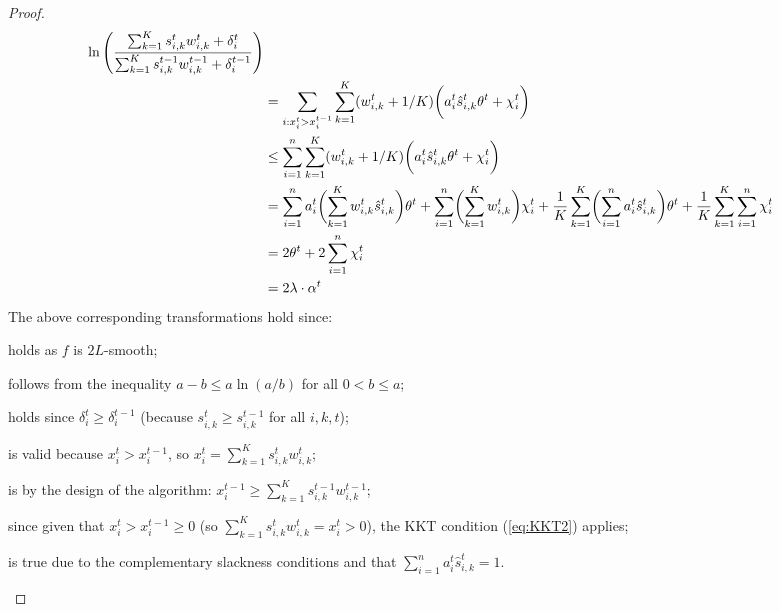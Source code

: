 \begin{proof}
\begin{align}
            \ln \left(\frac{ \sum_{k=1}^{K} s_{i,k}^{t} w_{i,k}^{t}  + \delta_{i}^{t}}{\sum_{k=1}^{K}  s_{i,k}^{t-1} w_{i,k}^{t-1}  + \delta_{i}^{t-1}}  \right) \notag \\
%
&=  \sum_{i: x_{i}^{t} > x_{i}^{t-1}} \sum_{k=1}^{K} (w_{i,k}^{t} + 1/K) \biggl( a_{i}^{t} \hat{s}_{i,k}^{t} \theta^{t} + \chi_{i}^{t} \biggr)  \\
%
&\leq \sum_{i=1}^{n} \sum_{k=1}^{K} (w_{i,k}^{t} + 1/K) \biggl( a_{i}^{t} \hat{s}_{i,k}^{t} \theta^{t} + \chi_{i}^{t} \biggr) \notag \\
%
&= \sum_{i=1}^{n} a_{i}^{t} \biggl(\sum_{k=1}^{K} w_{i,k}^{t} \hat{s}_{i,k}^{t} \biggr) \theta^t + \sum_{i=1}^{n} \biggl( \sum_{k=1}^{K} w_{i,k}^{t} \biggr) \chi_{i}^{t}
+ \frac{1}{K}  \sum_{k=1}^{K} \biggl( \sum_{i=1}^{n} a_{i}^{t}  \hat{s}_{i,k}^{t}  \biggr) \theta^t + \frac{1}{K} \sum_{k=1}^{K} \sum_{i=1}^{n} \chi_{i}^{t} 		\notag \\
%
&= 2 \theta^{t} + 2\sum_{i=1}^{n} \chi_{i}^{t} \\
%
&= 2\lambda \cdot \alpha^{t}	\notag
\end{align}
%
The above corresponding transformations hold since:
\begin{compactenum}[(1)]
    \setcounter{enumi}{1}
    \item holds as $f$ is $2L$-smooth;
    \item follows from the inequality $a - b \leq a \ln(a/b)$ for all $0 < b \leq a$;
    \item holds since $\delta_{i}^{t} \geq \delta_{i}^{t-1}$ (because $s_{i,k}^{t} \geq s_{i,k}^{t-1}$ for all $i,k,t$);
    \item is valid because $x_{i}^{t} > x_{i}^{t-1}$, so $x_{i}^{t} = \sum_{k=1}^{K}  s_{i,k}^{t} w_{i,k}^{t}$;
    \item is by the design of the algorithm: $x_{i}^{t-1} \geq \sum_{k=1}^{K}  s_{i,k}^{t-1} w_{i,k}^{t-1}$;
    \setcounter{enumi}{5}
    \item since given that $x_{i}^{t} > x_{i}^{t-1} \geq 0$
    (so $\sum_{k=1}^{K}  s_{i,k}^{t} w_{i,k}^{t} = x_{i}^{t} > 0$), the KKT condition (\ref{eq:KKT2}) applies;
    \item is true due to the complementary slackness conditions
        and that $\sum_{i=1}^{n} a_{i}^{t}  \hat{s}_{i,k}^{t} = 1$.
\end{compactenum}


\end{proof}
